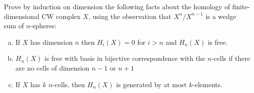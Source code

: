 \begin{homework}[e]
   Prove by induction on dimension the following facts about the homology of finite-dimensional CW complex $X$, using the observation that $X^n/X^{n-1}$ is a wedge sum of $n$-spheres:
  \begin{enumerate}[(a)]
    \item If $X$ has dimension $n$ then $H_i(X) = 0$ for $i > n$ and $H_n(X)$ is free.
    \item $H_n(X)$ is free with basis in bijective correspondence with the $n$-cells if there are no cells of dimension $n-1$ or $n+1$
    \item If $X$ has $k$ $n$-cells, then $H_n(X)$ is generated by at most $k$-elements.
  \end{enumerate}
\end{homework}
